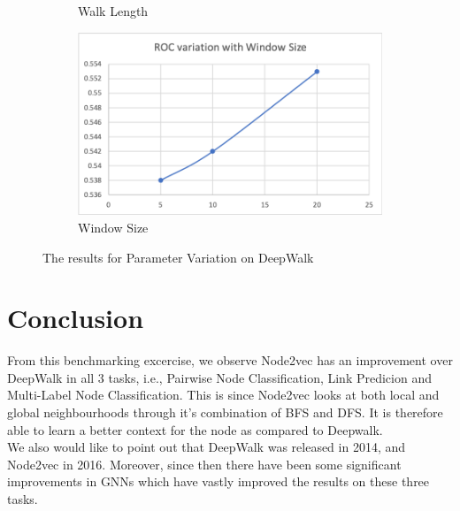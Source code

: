 \documentclass[sigconf]{acmart}
\begin{document}
\begin{figure}[h]
\begin{subfigure}[b]{0.49\linewidth}
    \caption{Walk Length}
  \end{subfigure}
  \begin{subfigure}[b]{0.49\linewidth}
    \includegraphics[width=\linewidth]{Images/Picture 1.4.png}
    \caption{Window Size}
  \end{subfigure}
  \caption{The results for Parameter Variation on DeepWalk}
  \label{fig:res4.4}
\end{figure}


\newpage
\section{Conclusion}
From this benchmarking excercise, we observe Node2vec has an improvement over DeepWalk in all 3 tasks, i.e., Pairwise Node Classification, Link Predicion and Multi-Label Node Classification. This is since Node2vec looks at both local and global neighbourhoods through it's combination of BFS and DFS. It is therefore able to learn a better context for the node as compared to Deepwalk. \\
We also would like to point out that DeepWalk was released in 2014, and Node2vec in 2016. Moreover, since then there have been some significant improvements in GNNs which have vastly improved the results on these three tasks.

\newpage



\end{document}
